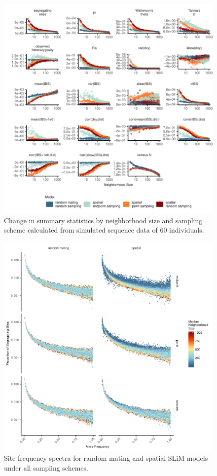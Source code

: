 \documentclass[10pt,twoside,lineno]{gsajnl}
\begin{document}
\afterpage{\clearpage}
\begin{figure}[p]
\centering
\includegraphics[width=\textwidth]{figures/sumstats_by_neighbors_allstats.pdf}
\caption{Change in summary statistics by neighborhood size and sampling scheme calculated from simulated sequence data of 60 individuals.}
\label{fig:allsumstats} 
\end{figure}


\afterpage{\clearpage}
\begin{figure}[p]
\centering
\includegraphics[width=\textwidth]{figures/fig_S1_sfs_grid_model_by_sampling.pdf}
\caption{Site frequency spectra for random mating and spatial SLiM models under all sampling schemes.}
\label{fig:allsfs}
\end{figure}
\end{document}

